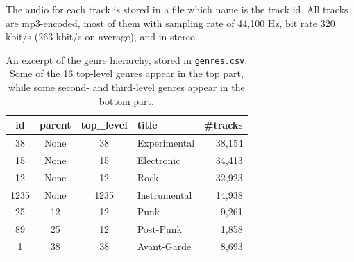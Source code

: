\documentclass{article}
\newcommand{\todo}[1]{{\color{red} #1}}
\begin{document}
The audio for each track is stored in a file which name is the track id. All tracks are mp3-encoded, most of them with sampling rate of 44,100 Hz, bit rate 320 kbit/s (263 kbit/s on average), and in stereo.

\begin{table}
	\small
	\centering
	\begin{tabular}{ccclr}
		\toprule
		id & parent & top\_level & title & \#tracks \\
		\midrule
		38 & None & 38 & Experimental & 38,154 \\
		15 & None & 15 & Electronic & 34,413 \\
		12 & None & 12 & Rock & 32,923 \\
		1235 & None & 1235 & Instrumental & 14,938 \\
		\midrule
		25 & 12 & 12 & Punk & 9,261 \\
		89 & 25 & 12 & Post-Punk & 1,858 \\
		1  & 38 & 38 & Avant-Garde & 8,693 \\
		\bottomrule
	\end{tabular}
	\caption{An excerpt of the genre hierarchy, stored in \texttt{genres.csv}. Some of the 16 top-level genres appear in the top part, while some second- and third-level genres appear in the bottom part.}
	\label{tab:genres}
\end{table}
\end{document}
